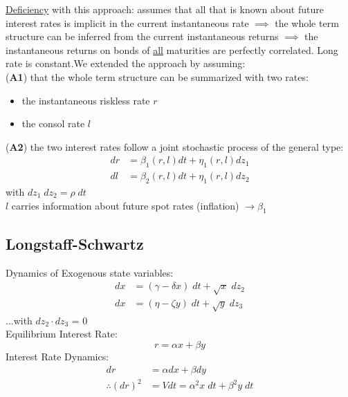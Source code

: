 \documentclass[
14pt,notheorems,hyperref={pdfauthor=whatever}
]{beamer}
\begin{document}
\begin{frame}
\underline{Deficiency} with this approach: assumes that all that is known about future interest rates is implicit in the current instantaneous rate $\implies$ the whole term structure can be inferred from the current instantaneous returns $\implies$ the instantaneous returns on bonds of \underline{all} maturities are perfectly correlated. Long rate is constant.We extended the approach by assuming:\\
\hfill\break
(\textbf{A1}) that the  whole term structure can be summarized with two rates:
\begin{itemize}
    \item the instantaneous riskless rate $r$
    \item the consol rate $l$
\end{itemize}
(\textbf{A2}) the two interest rates follow a joint stochastic process of the general type:
\begin{align*}
    dr &= \beta_1(r,l)dt + \eta_1(r,l)dz_1\\
    dl &= \beta_2(r,l)dt + \eta_1(r,l)dz_2
\end{align*}
with $dz_1\;dz_2 = \rho\;dt$\\
$l$ carries information about future spot rates (inflation) $\rightarrow \beta_1$  
\end{frame}

\subsection{Longstaff-Schwartz}
\begin{frame}
Dynamics of Exogenous state variables:
\begin{align*}
    dx &= (\gamma-\delta x)\;dt +\sqrt{x}\;dz_2\\
    dx &= (\eta-\zeta y)\;dt +\sqrt{y}\;dz_3
\end{align*}
...with $dz_2\cdot dz_3$ = 0\\
\hfill\break
Equilibrium Interest Rate:
\[ r = \alpha x + \beta y \]
Interest Rate Dynamics:
\begin{align*}
    dr &= \alpha dx + \beta dy\\
    \therefore (dr)^2 &= V dt = \alpha^2 x\;dt + \beta^2 y\;dt
\end{align*}
\end{frame}
\end{document}
